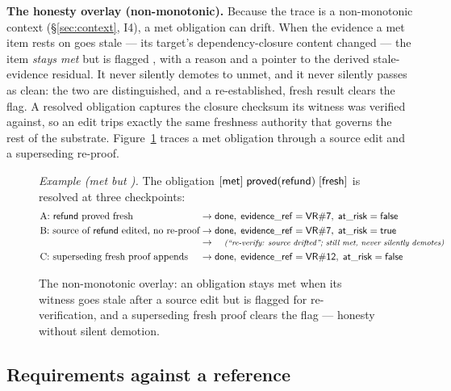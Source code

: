 \textbf{The  honesty overlay (non-monotonic).} Because the trace is a non-monotonic
context (\S\ref{sec:context}, I4), a met obligation can drift. When the evidence a met item rests on
goes stale --- its target's dependency-closure content changed --- the item \emph{stays met} but is
flagged , with a reason and a pointer to the derived stale-evidence residual. It never
silently demotes to unmet, and it never silently passes as clean: the two are distinguished, and a
re-established, fresh result clears the flag. A resolved obligation captures the closure checksum its
witness was verified against, so an edit trips exactly the same freshness authority that governs the
rest of the substrate. Figure~\ref{fig:goal-at-risk} traces a met obligation through a source edit and
a superseding re-proof.

\begin{figure}[H]
\centering
\small
\noindent\textit{Example (met but ).} The obligation $[\mathsf{met}]\;\mathsf{proved}(\mathsf{refund})\;[\mathsf{fresh}]$ is
resolved at three checkpoints:
\[
\begin{array}{@{}l@{\;\rightarrow\;}l@{}}
\text{A: \id{refund} proved fresh} & \id{done},\; \id{evidence\_ref} = \id{VR\#7},\; \id{at\_risk} = \id{false}\\[3pt]
\text{B: source of \id{refund} edited, no re-proof} & \id{done},\; \id{evidence\_ref} = \id{VR\#7},\; \id{at\_risk} = \id{true}\\
 & \quad\text{\footnotesize\itshape (``re-verify: source drifted''; still met, never silently demotes)}\\[3pt]
\text{C: superseding fresh proof appends} & \id{done},\; \id{evidence\_ref} = \id{VR\#12},\; \id{at\_risk} = \id{false}
\end{array}
\]
\caption{The non-monotonic  overlay: an obligation stays met when its witness goes stale after a source edit but is flagged for re-verification, and a superseding fresh proof clears the flag --- honesty without silent demotion.}
\label{fig:goal-at-risk}
\end{figure}

\subsection{Requirements against a reference}\label{sec:goals-reference}

